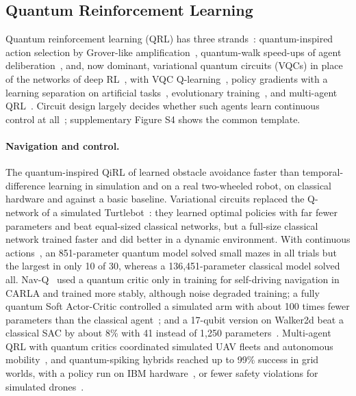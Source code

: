 \documentclass[acmsmall,screen,review]{acmart}
\begin{document}
\subsection{Quantum Reinforcement Learning}\label{sec:qrl}
Quantum reinforcement learning (QRL) has three strands~\cite{Meyer2022,Dunjko2018}: quantum-inspired action selection by Grover-like amplification~\cite{Dong2008}, quantum-walk speed-ups of agent deliberation~\cite{Briegel2012,Paparo2014}, and, now dominant, variational quantum circuits (VQCs) in place of the networks of deep RL~\cite{Sutton2018}, with VQC Q-learning~\cite{Chen2020,Skolik2022}, policy gradients with a learning separation on artificial tasks~\cite{Jerbi2021}, evolutionary training~\cite{Chen2022}, and multi-agent QRL~\cite{Yun2022}. Circuit design largely decides whether such agents learn continuous control at all~\cite{Kruse2024}; supplementary Figure S4 shows the common template.

\paragraph{Navigation and control.} The quantum-inspired QiRL of \citet{Dong2012} learned obstacle avoidance faster than temporal-difference learning in simulation and on a real two-wheeled robot, on classical hardware and against a basic baseline. Variational circuits replaced the Q-network of a simulated Turtlebot~\cite{Hohenfeld2024}: they learned optimal policies with far fewer parameters and beat equal-sized classical networks, but a full-size classical network trained faster and did better in a dynamic environment. With continuous actions~\cite{Dragan2025}, an 851-parameter quantum model solved small mazes in all trials but the largest in only 10 of 30, whereas a 136,451-parameter classical model solved all. Nav-Q~\cite{Sinha2023} used a quantum critic only in training for self-driving navigation in CARLA and trained more stably, although noise degraded training; a fully quantum Soft Actor-Critic controlled a simulated arm with about 100 times fewer parameters than the classical agent~\cite{Acuto2022}; and a 17-qubit version on Walker2d beat a classical SAC by about 8\% with 41 instead of 1,250 parameters~\cite{Lokossou2025}. Multi-agent QRL with quantum critics coordinated simulated UAV fleets and autonomous mobility~\cite{Park2023,Park2024}, and quantum-spiking hybrids reached up to 99\% success in grid worlds, with a policy run on IBM hardware~\cite{Altrabulsi2026}, or fewer safety violations for simulated drones~\cite{Taghavi2025}.
\end{document}
